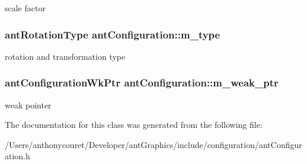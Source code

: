scale factor \hypertarget{classant_configuration_a9c6602c2995ea38583650da13b36b015}{
\subsubsection[{m\+\_\+type}]{\setlength{\rightskip}{0pt plus 5cm}ant\+Rotation\+Type ant\+Configuration\+::m\+\_\+type\hspace{0.3cm}{\ttfamily [private]}}}\label{classant_configuration_a9c6602c2995ea38583650da13b36b015}
rotation and transformation type \hypertarget{classant_configuration_a0ee5b6d1666f12fc211e274023780510}{
\subsubsection[{m\+\_\+weak\+\_\+ptr}]{\setlength{\rightskip}{0pt plus 5cm}ant\+Configuration\+Wk\+Ptr ant\+Configuration\+::m\+\_\+weak\+\_\+ptr\hspace{0.3cm}{\ttfamily [private]}}}\label{classant_configuration_a0ee5b6d1666f12fc211e274023780510}
weak pointer 

The documentation for this class was generated from the following file\+:\begin{DoxyCompactItemize}
\item 
/\+Users/anthonycouret/\+Developer/ant\+Graphics/include/configuration/ant\+Configuration.\+h\end{DoxyCompactItemize}
